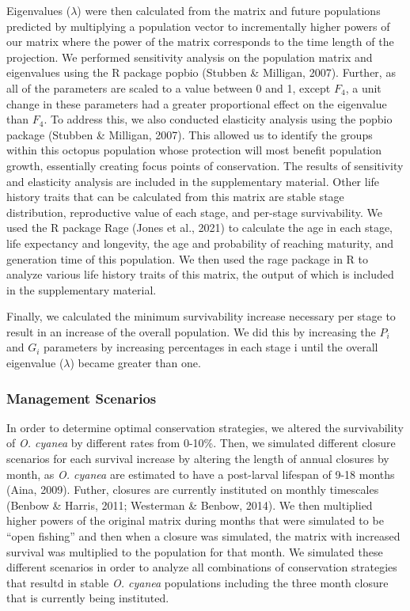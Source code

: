 \documentclass[
  12pt,
]{article}
\begin{document}
Eigenvalues (\(\lambda\)) were then calculated from the matrix and future populations predicted by multiplying a population vector to incrementally higher powers of our matrix where the power of the matrix corresponds to the time length of the projection. We performed sensitivity analysis on the population matrix and eigenvalues using the R package popbio (Stubben \& Milligan, 2007). Further, as all of the parameters are scaled to a value between 0 and 1, except \(F_4\), a unit change in these parameters had a greater proportional effect on the eigenvalue than \(F_4\). To address this, we also conducted elasticity analysis using the popbio package (Stubben \& Milligan, 2007). This allowed us to identify the groups within this octopus population whose protection will most benefit population growth, essentially creating focus points of conservation. The results of sensitivity and elasticity analysis are included in the supplementary material. Other life history traits that can be calculated from this matrix are stable stage distribution, reproductive value of each stage, and per-stage survivability. We used the R package Rage (Jones et al., 2021) to calculate the age in each stage, life expectancy and longevity, the age and probability of reaching maturity, and generation time of this population. We then used the rage package in R to analyze various life history traits of this matrix, the output of which is included in the supplementary material.

Finally, we calculated the minimum survivability increase necessary per stage to result in an increase of the overall population. We did this by increasing the \(P_i\) and \(G_i\) parameters by increasing percentages in each stage i until the overall eigenvalue (\(\lambda\)) became greater than one.

\hypertarget{management-scenarios}{%
\subsubsection{Management Scenarios}\label{management-scenarios}}

In order to determine optimal conservation strategies, we altered the survivability of \emph{O. cyanea} by different rates from 0-10\%. Then, we simulated different closure scenarios for each survival increase by altering the length of annual closures by month, as \emph{O. cyanea} are estimated to have a post-larval lifespan of 9-18 months (Aina, 2009). Futher, closures are currently instituted on monthly timescales (Benbow \& Harris, 2011; Westerman \& Benbow, 2014). We then multiplied higher powers of the original matrix during months that were simulated to be ``open fishing'' and then when a closure was simulated, the matrix with increased survival was multiplied to the population for that month. We simulated these different scenarios in order to analyze all combinations of conservation strategies that resultd in stable \emph{O. cyanea} populations including the three month closure that is currently being instituted.
\end{document}

